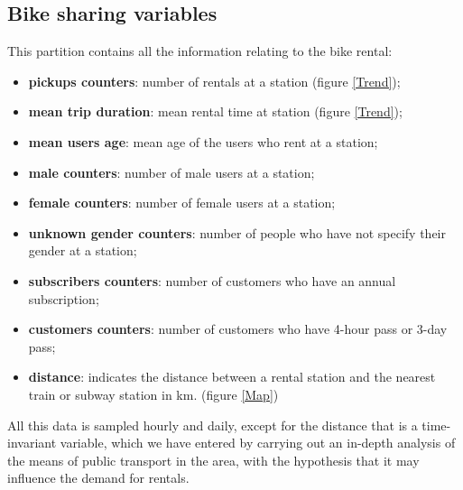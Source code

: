 \subsection{Bike sharing variables}
This partition contains all the information relating to the bike rental:
\begin{itemize}
	\item \textbf{pickups counters}: number of rentals at a station (figure \ref{Trend});
	\item \textbf{mean trip duration}: mean rental time at station (figure \ref{Trend});
	\item \textbf{mean users age}: mean age of the users who rent at a station;
	\item \textbf{male counters}: number of male users at a station;
	\item \textbf{female counters}: number of female users at a station;
	\item \textbf{unknown gender counters}: number of people who have not specify their gender at a station;
	\item \textbf{subscribers counters}: number of customers who have an annual subscription;
	\item \textbf{customers counters}: number of customers who have \num{4}-hour pass or \num{3}-day pass;
	\item \textbf{distance}: indicates the distance between a rental station and the nearest train or subway station in \unit{\kilo\meter}. (figure \ref{Map})
	
\end{itemize}
All this data is sampled hourly and daily, except for the distance that is a time-invariant variable, which we have entered by carrying out an in-depth analysis of the means of public transport in the area, with the hypothesis that it may influence the demand for rentals.


